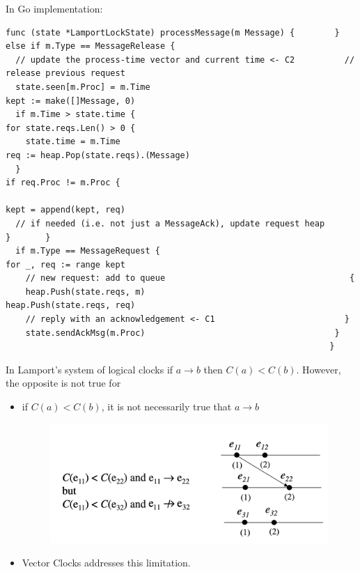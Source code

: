 \documentclass[acmlarge]{acmart}
\begin{document}
In Go implementation:

\begin{lstlisting}
func (state *LamportLockState) processMessage(m Message) {        } else if m.Type == MessageRelease {       
  // update the process-time vector and current time <- C2          // release previous request       
  state.seen[m.Proc] = m.Time                                       kept := make([]Message, 0)               
  if m.Time > state.time {                                          for state.reqs.Len() > 0 {             
    state.time = m.Time                                              req := heap.Pop(state.reqs).(Message)         
  }                                                                   if req.Proc != m.Proc {                           
                                                                      kept = append(kept, req) 
  // if needed (i.e. not just a MessageAck), update request heap      }       }      
  if m.Type == MessageRequest {                                     for _, req := range kept 
    // new request: add to queue                                     {                      
    heap.Push(state.reqs, m)                                          heap.Push(state.reqs, req)                   
    // reply with an acknowledgement <- C1                          }                                     
    state.sendAckMsg(m.Proc)                                      }
                                                                 }      
  \end{lstlisting}

In Lamport's system of logical clocks if $a \rightarrow b$ then $C(a)<C(b)$. However, the opposite is not true for
\begin{itemize}
  \item if $C(a)<C(b)$, it is not necessarily true that $a \rightarrow b$
        \begin{figure}[h]
          \centering
          \includegraphics[width=0.3\linewidth]{opposite.png}
          \caption{}
        \end{figure}

  \item Vector Clocks addresses this limitation.
\end{itemize}
\end{document}
